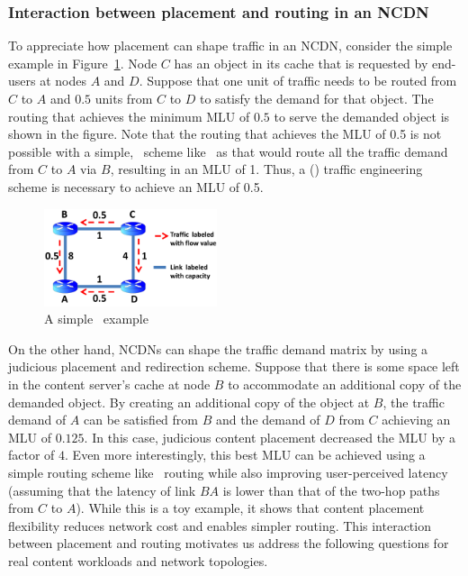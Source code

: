 \subsubsection{Interaction between placement and routing in an NCDN}
\label{sec:bg-ncdn-interaction}

To appreciate how placement can shape traffic in an NCDN, consider the simple example in Figure~\ref{fig:NetworkExample}. Node $C$ has an object in its cache that is requested by end-users at nodes $A$ and $D$. Suppose that one unit of traffic needs to be routed from $C$ to $A$ and $0.5$ units  from $C$ to $D$ to satisfy the demand for that object. The routing that achieves the minimum MLU of $0.5$ to serve the demanded object is shown in the figure. Note that the routing that achieves the MLU of 0.5 is not possible with a simple, \unplanned\ scheme like \invcap\ as that would route all the traffic demand from $C$ to $A$ via $B$, resulting in an MLU of 1. Thus, a (\planned) traffic engineering scheme is necessary to achieve an MLU of 0.5.

\begin{figure}[h]
	\centering
	\includegraphics[width=2in]{ncdnpaper/ncdn-example}
	\caption{A simple \ncp\ example}
	\vspace{-.3in}
	\label{fig:NetworkExample}
\end{figure}

On the other hand, NCDNs can shape the traffic demand matrix by using a judicious placement and redirection scheme. Suppose that there is some space left in the content server's cache at node $B$ to accommodate an additional copy of the demanded object. By creating an additional copy of the object at $B$, the traffic demand of $A$ can be satisfied from $B$ and the demand of $D$ from $C$ achieving an MLU of $0.125$. In this case, judicious content placement decreased the MLU by a factor of $4$. Even more interestingly, this best MLU can be achieved using a simple routing scheme like \invcap\ routing while also improving user-perceived latency (assuming that the latency of link $BA$ is lower than that of the two-hop paths from $C$ to $A$). While this is a toy example, it shows that content placement flexibility reduces network cost and enables simpler routing. This interaction between placement and routing motivates us address the following questions for real content workloads and network topologies. 

